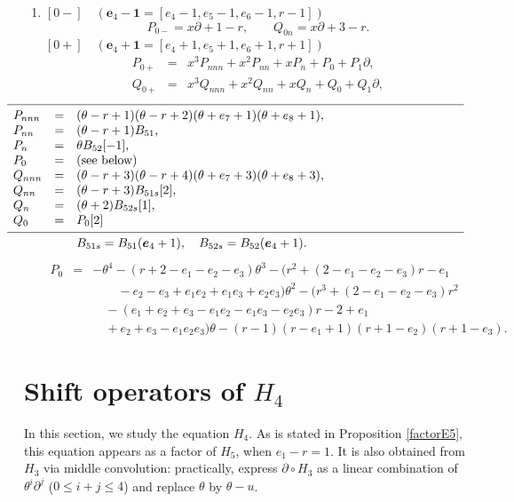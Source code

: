 \documentclass[a4paper,12pt]{article}
\theoremstyle{definition}
\theoremstyle{remark}
\numberwithin{equation}{section} %
\begin{document}
\begin{enumerate}
\vskip0.5pc
\item $[0-]\quad({\bm e}_4-{\bm 1}=[e_4-1,e_5-1,e_6-1,r-1])$
\[  P_{0-} = x\partial +1-r, \qquad Q_{0n}= x\partial+3-r.\]
  $[0+]\quad({\bm e}_4+{\bm 1}=[e_4+1,e_5+1,e_6+1,r+1])$
\[ \begin{array}{rcl}
  P_{0+}&=&x^3P_{nnn}+x^2P_{nn}+xP_n+P_0+P_1\partial,\\ [1mm]
  Q_{0+}&=&x^3Q_{nnn}+x^2Q_{nn}+xQ_n+Q_0+Q_1\partial,
\end{array} \]  
\[
\hskip-36pt
\begin{array}{lcp{10.8cm}}\hline\noalign{\smallskip}  
  P_{nnn} &=& $(\theta-r+1)(\theta-r+2)(\theta+e_7+1)(\theta+e_8+1)$,  \\ 
  P_{nn}  &=& $(\theta-r+1)B_{51}$,  \\ 
  P_{n}  &=&  $\theta B_{52}[-1]$,  \\ 
  P_{0}  &=&  (see\ below)  \\
  Q_{nnn}  &=& $(\theta-r+3)(\theta-r+4)(\theta+e_7+3)(\theta+e_8+3)$, \\
  Q_{nn}  &=& $(\theta-r+3)B_{51s}[2]$, \\
  Q_{n}  &=&  $(\theta+2)B_{52s}[1]$, \\
  Q_{0} &=& $P_{0}[2]$ \\
\noalign{\smallskip}    \hline \noalign{\smallskip}  
&& $B_{51s}=B_{51}({\bm e}_4+1),\quad B_{52s}=B_{52}({\bm e}_4+1)$.
\end{array}
\]
\[
\begin{array}{lcl}
  P_{0} &=& -\theta^4-(r+2-e_1-e_2-e_3)\theta^3-(r^2+(2-e_1-e_2-e_3)r-e_1 \\
  &&\qquad -e_2-e_3+e_1e_2+e_1e_3+e_2e_3)\theta^2 -(r^3+(2-e_1-e_2-e_3)r^2 \\
  &&\quad -(e_1+e_2+e_3-e_1e_2-e_1e_3-e_2e_3)r-2+e_1\\
  &&\quad +e_2+e_3-e_1e_2e_3)\theta-(r-1)(r-e_1+1)(r+1-e_2)(r+1-e_3).
\end{array}
\]

\end{enumerate}




\section{Shift operators of $H_4$ }\label{E4ap1}
\secttoc
In this section, we study the equation $H_4$.
As is stated in Proposition \ref{factorE5},
this equation appears as a factor of $H_5$, when $e_1-r=1$. It is also obtained from $H_3$ via middle convolution: practically, express $\partial\circ H_3$ as a linear combination of $\theta^i\partial^j$ ($0\le i+j\le4$) and replace $\theta$ by $\theta-u$.
\end{document}

